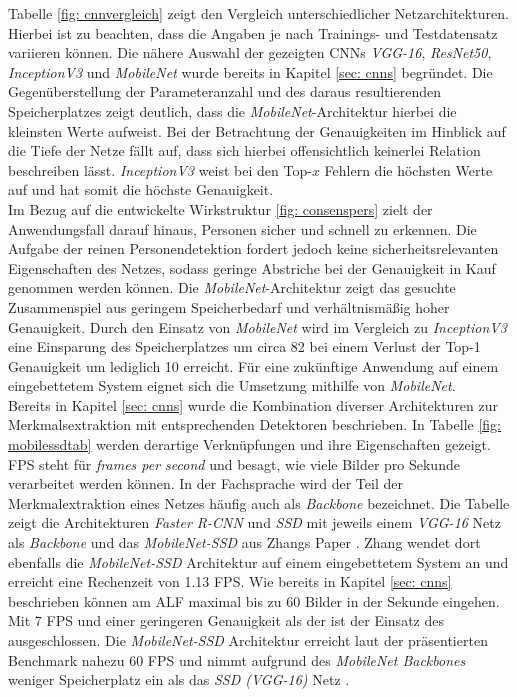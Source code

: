 		
		
			
		
		Tabelle \ref{fig: cnnvergleich} zeigt den Vergleich unterschiedlicher Netzarchitekturen. Hierbei ist zu beachten, dass die Angaben je nach Trainings- und Testdatensatz variieren können. Die nähere Auswahl der gezeigten CNNs \textit{VGG-16}, \textit{ResNet50}, \textit{InceptionV3} und \textit{MobileNet} wurde bereits in Kapitel \ref{sec: cnns} begründet. Die Gegenüberstellung der Parameteranzahl und des daraus resultierenden Speicherplatzes zeigt deutlich, dass die \textit{MobileNet}-Architektur hierbei die kleinsten Werte aufweist. Bei der Betrachtung der Genauigkeiten im Hinblick auf die Tiefe der Netze fällt auf, dass sich hierbei offensichtlich keinerlei Relation beschreiben lässt. \textit{InceptionV3} weist bei den Top-$x$ Fehlern die höchsten Werte auf und hat somit die höchste Genauigkeit.\\
		
		Im Bezug auf die entwickelte Wirkstruktur \ref{fig: consenspers} zielt der Anwendungsfall darauf hinaus, Personen sicher und schnell zu erkennen. Die Aufgabe der reinen Personendetektion fordert jedoch keine sicherheitsrelevanten Eigenschaften des Netzes, sodass geringe Abstriche bei der Genauigkeit in Kauf genommen werden können. Die \textit{MobileNet}-Architektur zeigt das gesuchte Zusammenspiel aus geringem Speicherbedarf und verhältnismäßig hoher Genauigkeit. Durch den Einsatz von \textit{MobileNet} wird im Vergleich zu \textit{InceptionV3} eine Einsparung des Speicherplatzes um circa 82 \percent\text{ }bei einem Verlust der Top-1 Genauigkeit um lediglich 10 \percent\textit{ }erreicht. Für eine zukünftige Anwendung auf einem eingebettetem System eignet sich die Umsetzung mithilfe von \textit{MobileNet}.\\
		
		
		
		Bereits in Kapitel \ref{sec: cnns} wurde die Kombination diverser Architekturen zur Merkmalsextraktion mit entsprechenden Detektoren beschrieben. In Tabelle \ref{fig: mobilessdtab} werden derartige Verknüpfungen und ihre Eigenschaften gezeigt. FPS steht für \textit{frames per second} und besagt, wie viele Bilder pro Sekunde verarbeitet werden können. In der Fachsprache wird der Teil der Merkmalextraktion eines Netzes häufig auch als \textit{Backbone} bezeichnet. Die Tabelle zeigt die Architekturen \textit{Faster R-CNN} und \textit{SSD} mit jeweils einem \textit{VGG-16} Netz als \textit{Backbone} und das \textit{MobileNet-SSD} aus Zhangs Paper \cite{embedded}. Zhang wendet dort ebenfalls die \textit{MobileNet-SSD} Architektur auf einem eingebettetem System an und erreicht eine Rechenzeit von 1.13 FPS. Wie bereits in Kapitel \ref{sec: cnns} beschrieben können am ALF maximal bis zu 60 Bilder in der Sekunde eingehen. Mit 7 FPS und einer geringeren Genauigkeit als der  ist der Einsatz des  ausgeschlossen. Die \textit{MobileNet-SSD} Architektur erreicht laut der präsentierten Benchmark nahezu 60 FPS und nimmt aufgrund des \textit{MobileNet Backbones} weniger Speicherplatz ein als das \textit{SSD (VGG-16)} Netz \cite{leightweight}. \\ 
		
